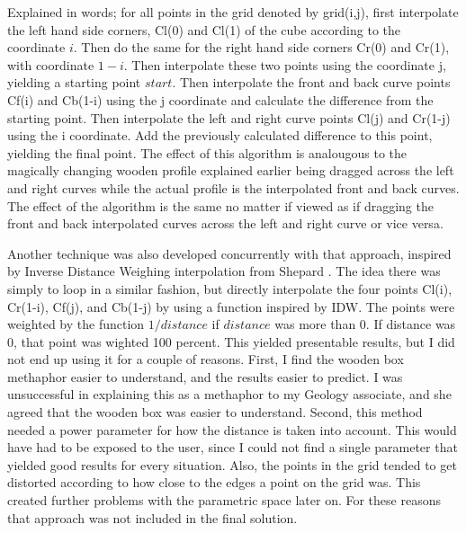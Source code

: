 \documentclass[a4paper,12pt]{report}
\begin{document}
Explained in words; for all points in the grid denoted by grid(i,j), first interpolate the left hand side corners, Cl(0) and Cl(1) of the cube according to the coordinate $i$. Then do the same for the right hand side corners Cr(0) and Cr(1), with coordinate $1-i$. Then interpolate these two points using the coordinate j, yielding a starting point $start$. Then interpolate the front and back curve points Cf(i) and Cb(1-i) using the j coordinate and calculate the difference from the starting point. Then interpolate the left and right curve points Cl(j) and Cr(1-j) using the i coordinate. Add the previously calculated difference to this point, yielding the final point. The effect of this algorithm is analougous to the magically changing wooden profile explained earlier being dragged across the left and right curves while the actual profile is the interpolated front and back curves. The effect of the algorithm is the same no matter if viewed as if dragging the front and back interpolated curves across the left 
and right curve or vice versa.



Another technique was also developed concurrently with that approach, inspired by Inverse Distance Weighing interpolation from Shepard \cite{shepard1968two}. The idea there was simply to loop in a similar fashion, but directly interpolate the four points Cl(i), Cr(1-i), Cf(j), and Cb(1-j) by using a function inspired by IDW. The points were weighted by the function $1/distance$ if $distance$ was more than 0. If distance was 0, that point was wighted 100 percent. This yielded presentable results, but I did not end up using it for a couple of reasons. First, I find the wooden box methaphor easier to understand, and the results easier to predict. I was unsuccessful in explaining this as a methaphor to my Geology associate, and she agreed that the wooden box was easier to understand. Second, this method needed a power parameter for how the distance is taken into account. This would have had to be exposed to the user, since I could not find a single parameter that yielded good results for every situation. Also, 
the points in the grid tended to get distorted according to how close to the edges a point on the grid was. This created further problems with the parametric space later on. For these reasons that approach was not included in the final solution.
\end{document}
